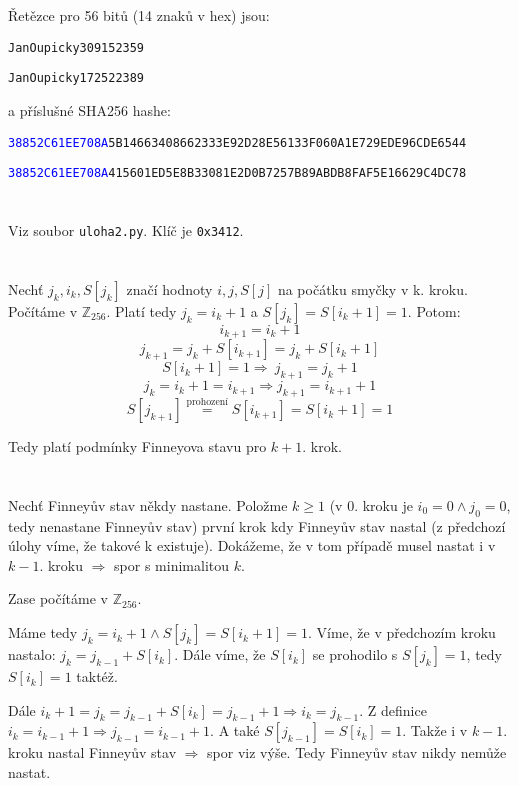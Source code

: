 \documentclass[12pt, a4paper]{article}
\begin{document}
\section{}
Řetězce pro 56 bitů (14 znaků v hex) jsou:

\texttt{JanOupicky309152359}

\texttt{JanOupicky172522389}

 a příslušné SHA256 hashe:

\texttt{\textcolor{blue}{38852C61EE708A}5B14663408662333E92D28E56133F060A1E729EDE96CDE6544}

\texttt{\textcolor{blue}{38852C61EE708A}415601ED5E8B33081E2D0B7257B89ABDB8FAF5E16629C4DC78}

\section{}
Viz soubor \texttt{uloha2.py}. Klíč je \texttt{0x3412}.

\section{}
Nechť $j_k, i_k, S[j_k]$ značí hodnoty $i,j,S[j]$ na počátku smyčky v k. kroku. Počítáme v $\mathbb{Z}_{256}$. Platí tedy $j_k = i_k + 1$ a $S[j_k]=S[i_k + 1] = 1$. Potom:\\
\[i_{k+1} = i_k + 1\]
\[j_{k+1} = j_k + S[i_{k+1}] =  j_k + S[i_k + 1]\]
\[S[i_k + 1] = 1 \Rightarrow\ j_{k+1} = j_k + 1\]
\[j_k = i_k + 1= i_{k+1} \Rightarrow j_{k+1} = i_{k+1} + 1\]
\[S[j_{k+1}] \stackrel{\text{prohození}}{=} S[i_{k+1}] = S[i_k + 1] =1 \]

Tedy platí podmínky Finneyova stavu pro $k+1$. krok.

\section{}
Nechť Finneyův stav někdy nastane. Položme $k \geq 1$ (v 0. kroku je $i_0=0 \land j_0=0$, tedy nenastane Finneyův stav) první krok kdy Finneyův stav nastal (z předchozí úlohy víme, že takové k existuje). Dokážeme, že v tom případě musel nastat i v $k-1$. kroku $\Rightarrow$ spor s minimalitou $k$.

Zase počítáme v $\mathbb{Z}_{256}$.

Máme tedy $j_k=i_k+1 \land S[j_k]=S[i_k + 1]=1$. Víme, že v předchozím kroku nastalo: $j_k = j_{k-1}+S[i_k]$. Dále víme, že $S[i_k]$ se prohodilo s $S[j_k] = 1$, tedy $S[i_k] = 1$ taktéž.

Dále $i_k + 1 = j_k = j_{k-1} + S[i_k] = j_{k-1} + 1 \Rightarrow i_k = j_{k-1}$. Z definice $i_k = i_{k-1}+1 \Rightarrow j_{k-1}=i_{k-1}+1$. A také $S[j_{k-1}]=S[i_k]=1$. Takže i v $k-1$. kroku nastal Finneyův stav $\Rightarrow$ spor viz výše. Tedy Finneyův stav nikdy nemůže nastat.
\end{document}
